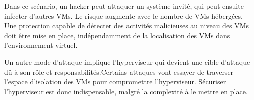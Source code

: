 Dans ce scénario, un hacker peut attaquer un système invité, qui peut ensuite infecter d'autres VMs. Le risque augmente avec le nombre de VMs hébergées. Une protection capable de détecter des activités malicieuses au niveau des VMs doit être mise en place, indépendamment de la localisation des VMs dans l'environnement virtuel.

Un autre mode d'attaque implique l'hyperviseur qui devient une cible d'attaque dû à son rôle et responsabilités.Certains attaques vont essayer de traverser l'espace d'isolation des VMs pour compromettre l'hyperviseur. Sécuriser l'hyperviseur est donc indispensable, malgré la complexité à le mettre en place.




